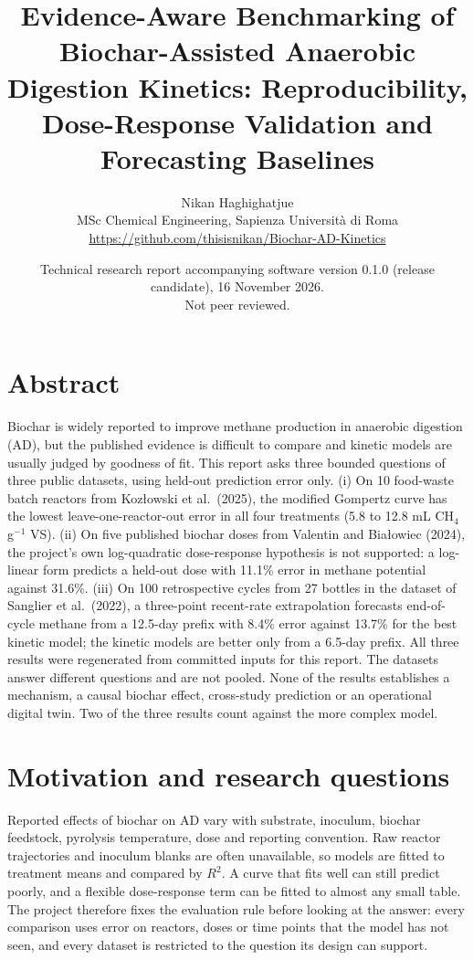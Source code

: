 \documentclass[10pt,a4paper]{article}
\title{\vspace{-1.2cm}\Large\bfseries Evidence-Aware Benchmarking of Biochar-Assisted Anaerobic Digestion Kinetics: Reproducibility, Dose-Response Validation and Forecasting Baselines}
\author{Nikan Haghighatjue\\ \small MSc Chemical Engineering, Sapienza Universit\`a di Roma\\ \small \url{https://github.com/thisisnikan/Biochar-AD-Kinetics}}
\date{\small Technical research report accompanying software version 0.1.0 (release candidate), 16 November 2026.\\ Not peer reviewed.}
\begin{document}
\maketitle
\vspace{-0.6cm}
\section*{Abstract}
Biochar is widely reported to improve methane production in anaerobic digestion (AD), but the published evidence is difficult to compare and kinetic models are usually judged by goodness of fit. This report asks three bounded questions of three public datasets, using held-out prediction error only. (i) On 10 food-waste batch reactors from Koz\l{}owski et al.\ (2025), the modified Gompertz curve has the lowest leave-one-reactor-out error in all four treatments (5.8 to 12.8 mL CH$_4$ g$^{-1}$ VS). (ii) On five published biochar doses from Valentin and Bia\l{}owiec (2024), the project's own log-quadratic dose-response hypothesis is not supported: a log-linear form predicts a held-out dose with 11.1\% error in methane potential against 31.6\%. (iii) On 100 retrospective cycles from 27 bottles in the dataset of Sanglier et al.\ (2022), a three-point recent-rate extrapolation forecasts end-of-cycle methane from a 12.5-day prefix with 8.4\% error against 13.7\% for the best kinetic model; the kinetic models are better only from a 6.5-day prefix. All three results were regenerated from committed inputs for this report. The datasets answer different questions and are not pooled. None of the results establishes a mechanism, a causal biochar effect, cross-study prediction or an operational digital twin. Two of the three results count against the more complex model.

\section{Motivation and research questions}
Reported effects of biochar on AD vary with substrate, inoculum, biochar feedstock, pyrolysis temperature, dose and reporting convention. Raw reactor trajectories and inoculum blanks are often unavailable, so models are fitted to treatment means and compared by $R^2$. A curve that fits well can still predict poorly, and a flexible dose-response term can be fitted to almost any small table. The project therefore fixes the evaluation rule before looking at the answer: every comparison uses error on reactors, doses or time points that the model has not seen, and every dataset is restricted to the question its design can support.
\end{document}
